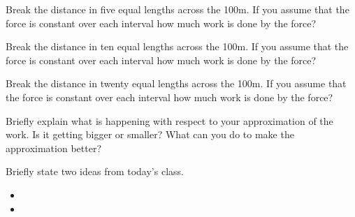 \begin{problem}
  \begin{subproblem}
  \item Break the distance in five equal lengths across the 100m.  If
    you assume that the force is constant over each interval how much
    work is done by the force?

    \vfill

  \item Break the distance in ten equal lengths across the 100m.  If
    you assume that the force is constant over each interval how much
    work is done by the force?

    \vfill

    \clearpage

  \item Break the distance in twenty equal lengths across the 100m.  If
    you assume that the force is constant over each interval how much
    work is done by the force?

    \vfill

  \item Briefly explain what is happening with respect to your
    approximation of the work. Is it getting bigger or smaller? What
    can you do to make the approximation better?

    \vspace{3em}

  \end{subproblem}
\end{problem}

\postClass

\begin{problem}
\item Briefly state two ideas from today's class.
  \begin{itemize}
  \item
  \item
  \end{itemize}
\item
  \begin{subproblem}
    \item
  \end{subproblem}
\end{problem}



